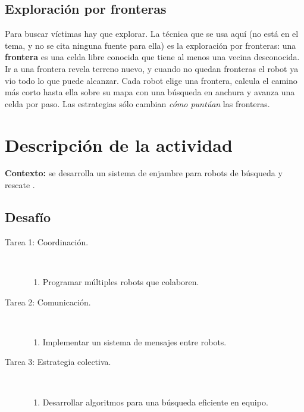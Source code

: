 \documentclass[11pt,letterpaper]{article}
\begin{document}
\subsection{Exploración por fronteras}

Para buscar víctimas hay que explorar. La técnica que se usa aquí (no está en el tema, y no se cita ninguna fuente para ella) es la exploración por fronteras: una \textbf{frontera} es una celda libre conocida que tiene al menos una vecina desconocida. Ir a una frontera revela terreno nuevo, y cuando no quedan fronteras el robot ya vio todo lo que puede alcanzar. Cada robot elige una frontera, calcula el camino más corto hasta ella sobre su mapa con una búsqueda en anchura y avanza una celda por paso. Las estrategias sólo cambian \emph{cómo puntúan} las fronteras.

\section{Descripción de la actividad}

\textbf{Contexto:} se desarrolla un sistema de enjambre para robots de búsqueda y rescate \parencite{iae_u4_t46}.

\subsection*{Desafío}

\begin{description}
    \item[Tarea 1: Coordinación.]\mbox{}\\[-1.3\baselineskip]
    \begin{enumerate}
        \item Programar múltiples robots que colaboren.
    \end{enumerate}
    \item[Tarea 2: Comunicación.]\mbox{}\\[-1.3\baselineskip]
    \begin{enumerate}
        \item Implementar un sistema de mensajes entre robots.
    \end{enumerate}
    \item[Tarea 3: Estrategia colectiva.]\mbox{}\\[-1.3\baselineskip]
    \begin{enumerate}
        \item Desarrollar algoritmos para una búsqueda eficiente en equipo.
    \end{enumerate}
\end{description}
\end{document}
